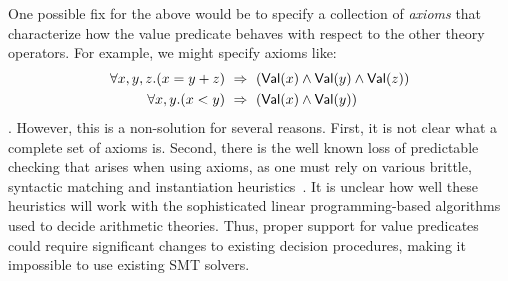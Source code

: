 
%
One possible fix for the above would be to specify a collection of
\emph{axioms} that characterize how the value predicate behaves with 
respect to the other theory operators. 
%
For example, we might specify axioms like: 
%
\begin{align*}
\forall x,y,z. (x = y + z)\ &\Rightarrow\ (\mathsf{Val}(x) \wedge \mathsf{Val}(y) \wedge \mathsf{Val}(z))\\
\forall x,y. (x < y )\ &\Rightarrow\ (\mathsf{Val}(x) \wedge \mathsf{Val}(y))
\end{align*}
%
\etc. However, this is a non-solution for several reasons. 
First, it is not clear what a complete set of axioms is.
Second, there is the well known loss of predictable checking
that arises when using axioms, as one must rely on various 
brittle, syntactic matching and instantiation heuristics~\cite{simplifyj}. 
%
It is unclear how well these heuristics will work with the
sophisticated linear programming-based algorithms used to 
decide arithmetic theories. 
%
Thus, proper support for value predicates could require 
significant changes to existing decision procedures, 
making it impossible to use existing SMT solvers.




